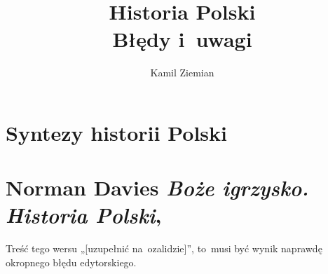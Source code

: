 \documentclass[a4paper,11pt]{article}
\title{Historia Polski \\
  {\Large Błędy i~uwagi}}
\author{Kamil Ziemian}
\numberwithin{equation}{section}
\begin{document}





\maketitle





\section{Syntezy historii Polski}

\VerSpaceTwo



\section{Norman Davies \textit{Boże igrzysko. Historia
    Polski}, \cite{DaviesBozeIgrzysko2010}}




 Treść tego wersu „[uzupełnić na~ozalidzie]”,
to~musi być wynik naprawdę okropnego błędu edytorskiego.






\end{document}
